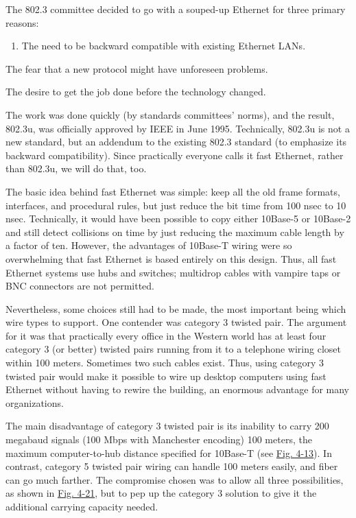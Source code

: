 The 802.3 committee decided to go with a souped-up Ethernet for three
primary reasons:

{}

\begin{enumerate}
\def\labelenumi{\arabic{enumi}.}
\item
  {}

  The need to be backward compatible with existing Ethernet LANs.
\end{enumerate}

{}

The fear that a new protocol might have unforeseen problems.

{}

The desire to get the job done before the technology changed.

The work was done quickly (by standards committees' norms), and the
result, {802.3u}, was officially approved by IEEE in June 1995.
Technically, 802.3u is not a new standard, but an addendum to the
existing 802.3 standard (to emphasize its backward compatibility). Since
practically everyone calls it {fast Ethernet}, rather than 802.3u, we
will do that, too.

The basic idea behind fast Ethernet was simple: keep all the old frame
formats, interfaces, and procedural rules, but just reduce the bit time
from 100 nsec to 10 nsec. Technically, it would have been possible to
copy either 10Base-5 or 10Base-2 and still detect collisions on time by
just reducing the maximum cable length by a factor of ten. However, the
advantages of 10Base-T wiring were so overwhelming that fast Ethernet is
based entirely on this design. Thus, all fast Ethernet systems use hubs
and switches; multidrop cables with vampire taps or BNC connectors are
not permitted.

Nevertheless, some choices still had to be made, the most important
being which wire types to support. One contender was category 3 twisted
pair. The argument for it was that practically every office in the
Western world has at least four category 3 (or better) twisted pairs
running from it to a telephone wiring closet within 100 meters.
Sometimes two such cables exist. Thus, using category 3 twisted pair
would make it possible to wire up desktop computers using fast Ethernet
without having to rewire the building, an enormous advantage for many
organizations.

The main disadvantage of category 3 twisted pair is its inability to
carry 200 megabaud signals (100 Mbps with Manchester encoding) 100
meters, the maximum computer-to-hub distance specified for 10Base-T (see
\protect\hyperlink{0130661023_ch04lev1sec3.htmlux5cux23ch04fig13}{Fig.
4-13}). In contrast, category 5 twisted pair wiring can handle 100
meters easily, and fiber can go much farther. The compromise chosen was
to allow all three possibilities, as shown in
\protect\hyperlink{0130661023_ch04lev1sec3.htmlux5cux23ch04fig21}{Fig.
4-21}, but to pep up the category 3 solution to give it the additional
carrying capacity needed.

